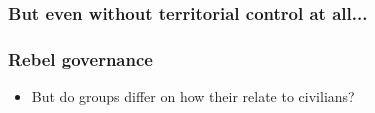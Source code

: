 \documentclass[aspectratio=43]{beamer}
\begin{document}
\begin{frame}
\frametitle{But even without territorial control at all...}
\centering

  
\end{frame}

  
\begin{frame}
\frametitle{Rebel governance}
\centering

\begin{itemize}
  \item But  do groups differ on how their relate to civilians?
\end{itemize}

\end{frame}
\end{document}
